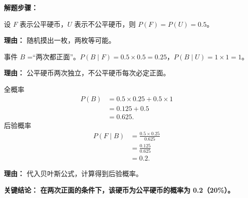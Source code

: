 \begin{examplebox}
	\textbf{\textcolor{CExample}{解题步骤：}}
	\begin{description}[style=nextline, leftmargin=2.8em, labelsep=0.5em, itemsep=0.45em]
		\item[\textbf{第一步（设定先验）：}] 设 $F$ 表示公平硬币，$U$ 表示不公平硬币，则 $P(F)=P(U)=0.5$。
			\par\textbf{理由：} 随机摸出一枚，两枚等可能。
		\item[\textbf{第二步（计算似然）：}] 事件 $B$ =“两次都正面”。$P(B\mid F)=0.5\times0.5=0.25$，$P(B\mid U)=1\times1=1$。
			\par\textbf{理由：} 公平硬币两次独立，不公平硬币每次必定正面。
		\item[\textbf{第三步（贝叶斯求解）：}] 全概率
			\[
				\begin{aligned}
					P(B) &= 0.5\times0.25+0.5\times1 \\
					&= 0.125+0.5 \\
					&= 0.625.
			\end{aligned}
			\]
			后验概率
			\[
				\begin{aligned}
					P(F\mid B) &= \frac{0.5\times0.25}{0.625} \\
					&= \frac{0.125}{0.625} \\
					&= 0.2.
			\end{aligned}
			\]
			\par\textbf{理由：} 代入贝叶斯公式，计算得到后验概率。
	\end{description}

	\textbf{\textcolor{CExample}{关键结论：}}
	\textbf{在两次正面的条件下，该硬币为公平硬币的概率为 0.2（20\%）。}
\end{examplebox}
